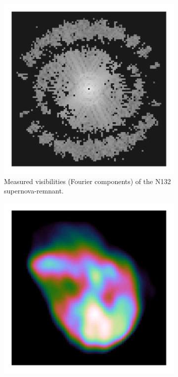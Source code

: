 \begin{figure}[h]
	\centering
	\begin{subfigure}{0.4\linewidth}
		\includegraphics[width=1.0\linewidth, clip, trim= 0.25in 0.25in 0.25in 0.25in]{./chapters/01.intro/reconstruction/CD-N132-FT.png}
		\caption{Measured visibilities (Fourier components) of the N132 supernova-remnant.}
		\label{intro:inversefig:uv}
	\end{subfigure}
	\begin{subfigure}{0.4\linewidth}
		\includegraphics[width=1.0\linewidth, clip, trim= 0.25in 0.25in 0.25in 0.25in]{./chapters/01.intro/reconstruction/CD-N132-naked.png}

\end{subfigure}
\end{figure}
